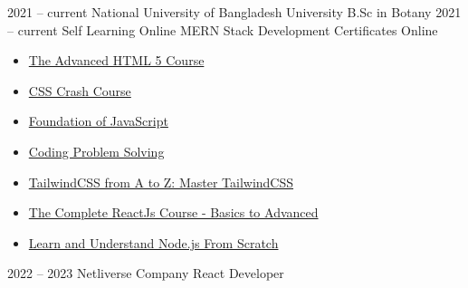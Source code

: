 \documentclass[9pt]{developercv} %
\begin{document}
\vspace{-10 pt}
\begin{entrylist}
    \entry
        {2021 -- current}
		{National University of Bangladesh}
		{University}
		{B.Sc in Botany}
    \entry
        {2021 -- current}
		{Self Learning}
		{Online}
		{MERN Stack Development}
	\entry 
         {}
		{Certificates}
		{Online}
  {\vspace{-10pt}
        \begin{itemize}[noitemsep,topsep=0pt,parsep=0pt,partopsep=0pt, leftmargin=-1pt]
            \item \href{https://ude.my/UC-17764204-0d20-48fc-a46a-bbba47b4e10a}{The Advanced HTML 5 Course}
            \item \href{https://ude.my/UC-03bcb081-37b0-4c87-b6ae-82da4df7f7e4}{CSS Crash Course}
            \item \href{https://drive.google.com/file/d/1MFcHnKhldKNf6xX_na6Q9pwkalTVlwre/view?usp=drivesdk}{Foundation of JavaScript}
            \item \href{https://drive.google.com/file/d/1M6jaFO06xIweORPI9UW7wM7kpJ8IixlH/view?usp=drivesdk}{Coding Problem Solving}
            \item \href{https://www.udemy.com/certificate/UC-7f7a3348-96c3-4b3e-b943-76d2eda0b4d7/}{TailwindCSS from A to Z: Master TailwindCSS}
            \item \href{https://ude.my/UC-4b22e9f6-13d0-4290-bbff-7f47bc2896ca}{The Complete ReactJs Course - Basics to Advanced}
           \item \href{https://ude.my/UC-89532c78-1057-4eb8-b166-fa3118b93bd6}{Learn and Understand Node.js From Scratch}
       \end{itemize}}
\end{entrylist}

\vspace{-10 pt}
\begin{entrylist}
	\entry
        {2022 --  2023}
		{Netliverse}
		{Company}
		{React Developer}
\end{entrylist}
\end{document}
